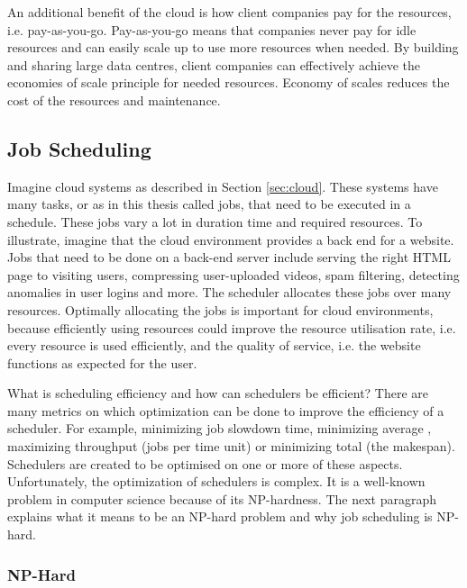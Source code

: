An additional benefit of the cloud is how client companies pay for the
resources, i.e. pay-as-you-go. Pay-as-you-go means that companies never pay
for idle resources and can easily scale up to use more resources when needed.
By building and sharing large data centres, client companies can effectively
achieve the economies of scale principle for needed resources. Economy of
scales reduces the cost of the resources and maintenance.


\subsection{Job Scheduling}\label{sec:scheduling}

Imagine cloud systems as described in Section \ref{sec:cloud}. These systems
have many tasks, or as in this thesis called jobs, that need to be executed in
a schedule. These jobs vary a lot in duration time and required resources. To
illustrate, imagine that the cloud environment provides a back end for a
website. Jobs that need to be done on a back-end server include serving the
right HTML page to visiting users, compressing user-uploaded videos, spam
filtering, detecting anomalies in user logins and more. The scheduler
allocates these jobs over many resources. Optimally allocating the jobs is
important for cloud environments, because efficiently using resources could
improve the resource utilisation rate, i.e. every resource is used
efficiently, and the quality of service, i.e. the website functions as
expected for the user.

What is scheduling efficiency and how can schedulers be efficient? There are
many metrics on which optimization can be done to improve the efficiency of a
scheduler. For example, minimizing job slowdown time, minimizing average
\jct, maximizing throughput (jobs per time unit) or minimizing
total \jct (the makespan). Schedulers are created to be optimised
on one or more of these aspects. Unfortunately, the
optimization of schedulers is complex. It is a well-known problem in computer
science because of its NP-hardness. The next paragraph explains what it means
to be an NP-hard problem and why job scheduling is NP-hard.


\subsubsection{NP-Hard}

